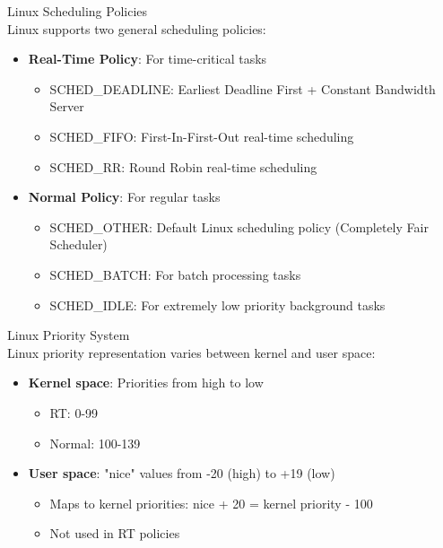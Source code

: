\begin{definition}{Linux Scheduling Policies}\\
    Linux supports two general scheduling policies:
    \begin{itemize}
        \item \textbf{Real-Time Policy}: For time-critical tasks
            \begin{itemize}
                \item SCHED\_DEADLINE: Earliest Deadline First + Constant Bandwidth Server
                \item SCHED\_FIFO: First-In-First-Out real-time scheduling
                \item SCHED\_RR: Round Robin real-time scheduling
            \end{itemize}
        \item \textbf{Normal Policy}: For regular tasks
            \begin{itemize}
                \item SCHED\_OTHER: Default Linux scheduling policy (Completely Fair Scheduler)
                \item SCHED\_BATCH: For batch processing tasks
                \item SCHED\_IDLE: For extremely low priority background tasks
            \end{itemize}
    \end{itemize}
\end{definition}

\begin{definition}{Linux Priority System}\\
    Linux priority representation varies between kernel and user space:
    \begin{itemize}
        \item \textbf{Kernel space}: Priorities from high to low
            \begin{itemize}
                \item RT: 0-99
                \item Normal: 100-139
            \end{itemize}
        \item \textbf{User space}: "nice" values from -20 (high) to +19 (low)
            \begin{itemize}
                \item Maps to kernel priorities: nice + 20 = kernel priority - 100
                \item Not used in RT policies
            \end{itemize}
    \end{itemize}
\end{definition}

